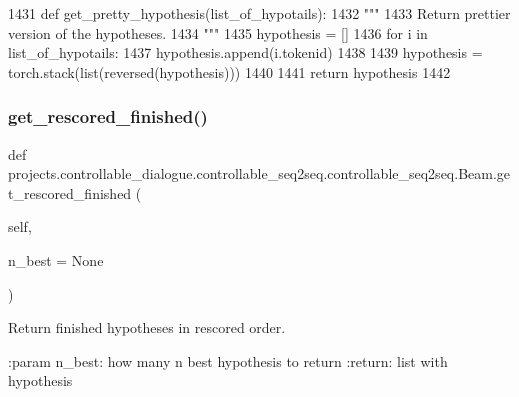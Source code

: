 \begin{DoxyCode}
1431     \textcolor{keyword}{def }get\_pretty\_hypothesis(list\_of\_hypotails):
1432         \textcolor{stringliteral}{"""}
1433 \textcolor{stringliteral}{        Return prettier version of the hypotheses.}
1434 \textcolor{stringliteral}{        """}
1435         hypothesis = []
1436         \textcolor{keywordflow}{for} i \textcolor{keywordflow}{in} list\_of\_hypotails:
1437             hypothesis.append(i.tokenid)
1438 
1439         hypothesis = torch.stack(list(reversed(hypothesis)))
1440 
1441         \textcolor{keywordflow}{return} hypothesis
1442 
\end{DoxyCode}
\mbox{\label{classprojects_1_1controllable__dialogue_1_1controllable__seq2seq_1_1controllable__seq2seq_1_1Beam_a9cea6bd5feecf982564b84d0b774e1c1}} 
\subsubsection{\texorpdfstring{get\+\_\+rescored\+\_\+finished()}{get\_rescored\_finished()}}
{\footnotesize\ttfamily def projects.\+controllable\+\_\+dialogue.\+controllable\+\_\+seq2seq.\+controllable\+\_\+seq2seq.\+Beam.\+get\+\_\+rescored\+\_\+finished (\begin{DoxyParamCaption}\item[{}]{self,  }\item[{}]{n\+\_\+best = {\ttfamily None} }\end{DoxyParamCaption})}

\begin{DoxyVerb}Return finished hypotheses in rescored order.

:param n_best:
    how many n best hypothesis to return
:return:
    list with hypothesis
\end{DoxyVerb}
 

